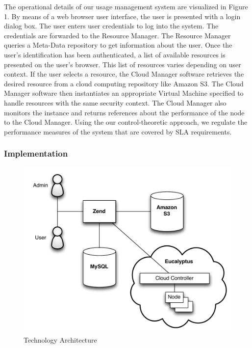 \documentclass{sig-alternate}
\begin{document}

The operational details of our usage management system are visualized in Figure 1.  By means of a web browser user interface, the user is presented with a login dialog box. The user enters user credentials to log into the system. The credentials are forwarded to the Resource Manager. The Resource Manager queries a Meta-Data repository to get information about the user.  Once the user's identification has been authenticated, a list of available resources is presented on the user's browser.  This list of resources varies depending on user context. If the user selects a resource, the Cloud Manager software retrieves the desired resource from a cloud computing repository like Amazon S3.  The Cloud Manager software then instantiates an appropriate Virtual Machine specified to handle resources with the same security context. The Cloud Manager also monitors the instance and returns references about the performance of the node to the Cloud Manager.  Using the our control-theoretic approach, we regulate the performance measures of the system that are covered by SLA requirements.

\subsubsection{Implementation}
\begin{figure}[h]
  \begin{center}
    \includegraphics[width=.49\textwidth]{Technology_Architecture}
  \end{center}
  \caption{Technology Architecture}
  \label{fig:convergence}
\end{figure}
\end{document}
